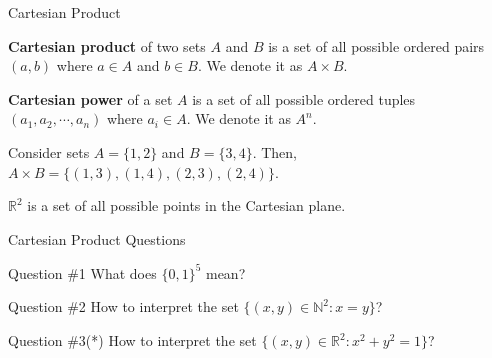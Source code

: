 \documentclass{beamer}
\begin{document}
    \begin{frame}{Cartesian Product}
        \begin{definition}
          \textbf{Cartesian product} of two sets $A$ and $B$ is a set of all possible ordered pairs $(a,b)$ where $a \in A$ and $b \in B$. We denote it as $A \times B$.\pause
        \end{definition}

        \begin{definition}
          \textbf{Cartesian power} of a set $A$ is a set of all possible ordered tuples $(a_1,a_2,\cdots,a_n)$ where $a_i \in A$. We denote it as $A^n$.\pause
        \end{definition}

        \begin{example}
          Consider sets $A = \{1,2\}$ and $B = \{3,4\}$. Then, $A \times B = \{(1,3), (1,4), (2,3), (2,4)\}$.\pause
        \end{example}

        \begin{example}
          $\mathbb{R}^2$ is a set of all possible points in the Cartesian plane.
        \end{example}
    \end{frame}

    \begin{frame}{Cartesian Product Questions}
      \begin{alertblock}{Question \#1}
        What does $\{0,1\}^{5}$ mean?\pause
      \end{alertblock}

      \begin{alertblock}{Question \#2}
        How to interpret the set $\{(x,y) \in \mathbb{N}^2: x = y\}$?\pause
      \end{alertblock}

      \begin{alertblock}{Question \#3(*)}
        How to interpret the set $\{(x,y) \in \mathbb{R}^2: x^2+y^2=1\}$?
      \end{alertblock}
    \end{frame}
\end{document}
